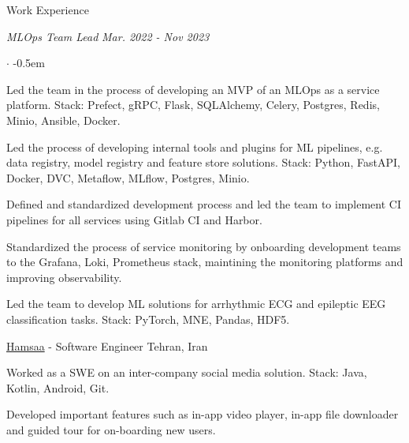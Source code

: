 \documentclass[../professional-cv.tex]{subfiles}
\begin{document}
\begin{rSection}{Work Experience}
\begin{rWorkSection}
		\vspace{-1em}
		{\em MLOps Team Lead} \hfill {\em Mar. 2022 - Nov 2023} \hspace{10pt}
		\normalfont
		\begin{list}{$\cdot$}{\leftmargin=10pt\normalfont \rightmargin=20pt}
			\itemsep -0.5em
			\item Led the team in the process of developing an MVP of an MLOps as a service platform. Stack: Prefect, gRPC, Flask, SQLAlchemy, Celery, Postgres, Redis, Minio, Ansible, Docker.
			\item Led the process of developing internal tools and plugins for ML pipelines, e.g. data registry, model registry and feature store solutions. Stack: Python, FastAPI, Docker, DVC, Metaflow, MLflow, Postgres, Minio.
			\item Defined and standardized development process and led the team to implement CI pipelines for all services using Gitlab CI and Harbor.
			\item Standardized the process of service monitoring by onboarding development teams to the Grafana, Loki, Prometheus stack, maintining the monitoring platforms and improving observability.
			\item Led the team to develop ML solutions for arrhythmic ECG and epileptic EEG classification tasks. Stack: PyTorch, MNE, Pandas, HDF5.
		\end{list}
	\end{rWorkSection}

	\begin{rSubsection}
		{\href{https://hamsaa.ir}{Hamsaa}}
		{  -  }
		{Software Engineer}
		{Tehran, Iran}
		\item Worked as a SWE on an inter-company social media solution. Stack: Java, Kotlin, Android, Git.
		\item Developed important features such as in-app video player, in-app file downloader and guided tour for on-boarding new users.

	\end{rSubsection}



\end{rSection}
\end{document}
